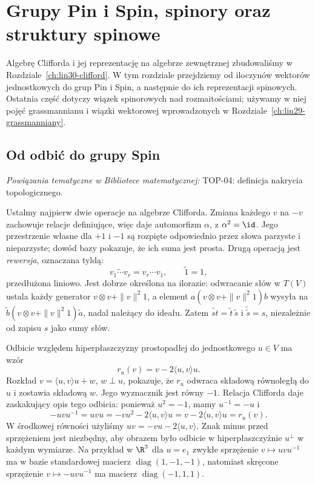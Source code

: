 \chapter{Grupy Pin i Spin, spinory oraz struktury spinowe}
\label{ch:lin31-spinory}

\providecommand{\atlasref}[2]{#2}


Algebrę Clifforda i jej reprezentację na algebrze zewnętrznej
zbudowaliśmy w Rozdziale~\ref{ch:lin30-clifford}.
W tym rozdziale przejdziemy od iloczynów wektorów jednostkowych
do grup Pin i Spin, a następnie do ich reprezentacji spinowych.
Ostatnia część dotyczy wiązek spinorowych nad rozmaitościami;
używamy w niej pojęć grassmannianu i wiązki wektorowej
wprowadzonych w Rozdziale~\ref{ch:lin29-grassmanniany}.

\section{Od odbić do grupy Spin}
\label{sec:lin31-spin-grupa}

\noindent\emph{Powiązania tematyczne w Bibliotece matematycznej:} \atlasref{TOP-04::def:nakrycie}{TOP-04: definicja nakrycia topologicznego}.


Ustalmy najpierw dwie operacje na algebrze Clifforda.
Zmiana każdego $v$ na $-v$ zachowuje relacje definiujące,
więc daje automorfizm $\alpha$, z $\alpha^2=\id$.
Jego przestrzenie własne dla $+1$ i $-1$ są rozpięte
odpowiednio przez słowa parzyste i nieparzyste; dowód bazy
pokazuje, że ich suma jest prosta.
Drugą operacją jest \emph{rewersja}, oznaczana tyldą:
\[
 \widetilde{v_1\cdots v_r}=v_r\cdots v_1,\qquad
 \widetilde 1=1,
\]
przedłużona liniowo. Jest dobrze określona na ilorazie:
odwracanie słów w $T(V)$ ustala każdy generator
$v\otimes v+\|v\|^2 1$, a element $a(v\otimes v+\|v\|^2 1)b$
wysyła na $\widetilde b(v\otimes v+\|v\|^2 1)\widetilde a$,
nadal należący do ideału. Zatem
$\widetilde{st}=\widetilde t\,\widetilde s$ i
$\widetilde{\widetilde s}=s$, niezależnie od zapisu $s$ jako sumy słów.

Odbicie względem hiperpłaszczyzny prostopadłej
do jednostkowego $u\in V$ ma wzór
\begin{equation}\label{eq:lin31-spin-odbicie}
 r_u(v)=v-2\langle u,v\rangle u.
\end{equation}
Rozkład $v=\langle u,v\rangle u+w$, $w\perp u$,
pokazuje, że $r_u$ odwraca składową równoległą do $u$
i zostawia składową $w$. Jego wyznacznik jest równy $-1$.
Relacja Clifforda daje zaskakujący opis tego odbicia:
ponieważ $u^2=-1$, mamy $u^{-1}=-u$ i
\[
 -uvu^{-1}=uvu
 =-vu^2-2\langle u,v\rangle u
 =v-2\langle u,v\rangle u
 =r_u(v).
\]
W środkowej równości użyliśmy
$uv=-vu-2\langle u,v\rangle$. Znak minus przed
sprzężeniem jest niezbędny, aby obrazem było odbicie
w hiperpłaszczyźnie $u^\perp$ w każdym wymiarze.
Na przykład w $\R^3$ dla $u=e_1$ zwykłe sprzężenie
$v\mapsto uvu^{-1}$ ma w bazie standardowej macierz
$\operatorname{diag}(1,-1,-1)$, natomiast skręcone sprzężenie
$v\mapsto-uvu^{-1}$ ma macierz $\operatorname{diag}(-1,1,1)$.

